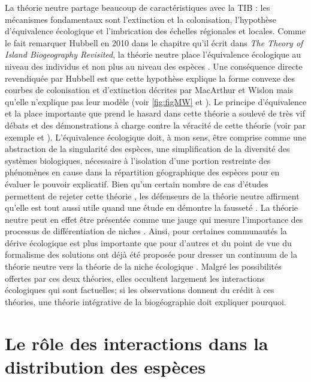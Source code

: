 La théorie neutre partage beaucoup de caractéristiques avec la TIB : les
mécanismes fondamentaux sont l'extinction et la colonisation,
l'hypothèse d'équivalence écologique et l'imbrication des échelles
régionales et locales. Comme le fait remarquer Hubbell en 2010 dans le
chapitre qu'il écrit dans \emph{The Theory of Island Biogeography
Revisited}, la théorie neutre place l'équivalence écologique au niveau
des individus et non plus au niveau des espèces \citep{Hubbell2010}. Une
conséquence directe revendiquée par Hubbell est que cette hypothèse
explique la forme convexe des courbes de colonisation et d'extinction
décrites par MacArthur et Wislon mais qu'elle n'explique pas leur modèle
(voir \ref{fig:figMW} et \citet{Hubbell2010}). Le principe d'équivalence
et la place importante que prend le hasard dans cette théorie a soulevé
de très vif débats et des démonstrations à charge contre la véracité de
cette théorie (voir par exemple \citet{McGill2003} et
\citet{Ricklefs2003}). L'équivalence écologique doit, à mon sens, être
comprise comme une abstraction de la singularité des espèces, une
simplification de la diversité des systèmes biologiques, nécessaire à
l'isolation d'une portion restreinte des phénomènes en cause dans la
répartition géographique des espèces pour en évaluer le pouvoir
explicatif. Bien qu'un certain nombre de cas d'études permettent de
rejeter cette théorie \citep{McGill2003, John2007}, les défenseurs de la
théorie neutre affirment qu'elle est tout aussi utile quand une étude en
démontre la fausseté \citep{Rosindell2012}. La théorie neutre peut en
effet être présentée comme une jauge qui mesure l'importance des
processus de différentiation de niches \citep{Wennekes2012}. Ainsi, pour
certaines communautés la dérive écologique est plus importante que pour
d'autres et du point de vue du formalisme des solutions ont déjà été
proposée pour dresser un continuum de la théorie neutre vers la théorie
de la niche écologique \citep{Gravel2006a}. Malgré les possibilités
offertes par ces deux théories, elles occultent largement les
interactions écologiques qui sont factuelles; si les observations
donnent du crédit à ces théories, une théorie intégrative de la
biogéographie doit expliquer pourquoi.

\section*{Le rôle des interactions dans la distribution des
espèces}\label{le-ruxf4le-des-interactions-dans-la-distribution-des-espuxe8ces}

